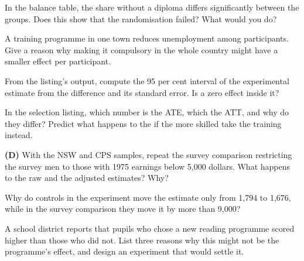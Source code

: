 \begin{exercise}[$\star$]\label{exo:b2:causality-and-experiments:3}
In the balance table, the share without a diploma differs significantly between the groups. Does this show that the
randomisation failed? What would you do?
\end{exercise}

\begin{exercise}[$\star$]\label{exo:b2:causality-and-experiments:4}
A training programme in one town reduces unemployment among participants. Give a reason why making it compulsory in the
whole country might have a smaller effect per participant.
\end{exercise}

\begin{exercise}[$\star\star$]\label{exo:b2:causality-and-experiments:5}
From the listing's output, compute the 95 per cent interval of the experimental estimate from the difference and its
standard error. Is a zero effect inside it?
\end{exercise}

\begin{exercise}[$\star\star$]\label{exo:b2:causality-and-experiments:6}
In the selection listing, which number is the ATE, which the ATT, and why do they differ? Predict what happens to the
 if the more skilled take the training instead.
\end{exercise}

\begin{exercise}[$\star\star$]\label{exo:b2:causality-and-experiments:7}
\textbf{(D)} With the NSW and CPS samples, repeat the survey comparison restricting the survey men to those with 1975
earnings below 5,000 dollars. What happens to the raw and the adjusted estimates? Why?
\end{exercise}

\begin{exercise}[$\star\star$]\label{exo:b2:causality-and-experiments:8}
Why do controls in the experiment move the estimate only from 1,794 to 1,676, while in the survey comparison they move it
by more than 9,000?
\end{exercise}

\begin{exercise}[$\star\star$]\label{exo:b2:causality-and-experiments:9}
A school district reports that pupils who chose a new reading programme scored higher than those who did not. List three
reasons why this might not be the programme's effect, and design an experiment that would settle it.
\end{exercise}

